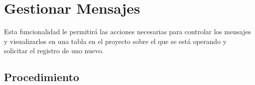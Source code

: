\hypertarget{cv:GestionarGlosario}{\section{Gestionar Mensajes}} \label{sec:GestionarMensajes}

	Esta funcionalidad le permitirá las acciones necesarias para controlar los mensajes y visualizarlos en una tabla en el proyecto sobre el que se está operando y solicitar el registro de uno nuevo.

		\subsection{Procedimiento}

